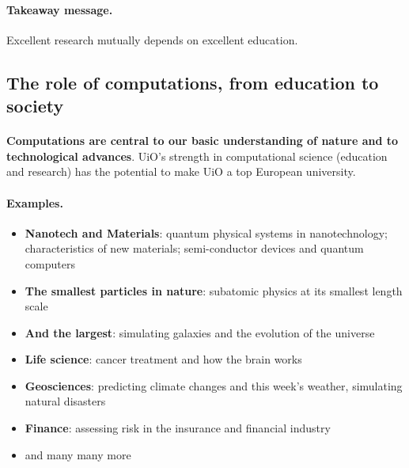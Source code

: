 \documentclass[%
twoside,                 %
final,                   %
10pt]{article}
\begin{document}
\noindent



\paragraph{Takeaway message.}
Excellent research mutually depends on excellent education.



\subsection*{The role of computations, from education to society}

\paragraph{}
\textbf{Computations are central to our 
basic understanding of nature and to technological advances}.
UiO's strength in computational science (education and research)
has the potential to make UiO a top European university.




\paragraph{Examples.}
\begin{itemize}
\item \textbf{Nanotech and Materials}: quantum physical systems in nanotechnology; characteristics of new materials; semi-conductor devices and quantum computers

\item \textbf{The smallest particles in nature}: subatomic physics at its smallest length scale

\item \textbf{And the largest}: simulating galaxies and the evolution of the universe

\item \textbf{Life science}: cancer treatment and how the brain works

\item \textbf{Geosciences}: predicting climate changes and this week's weather, simulating natural disasters

\item \textbf{Finance}: assessing risk in the insurance and financial industry

\item and many many more
\end{itemize}
\end{document}
